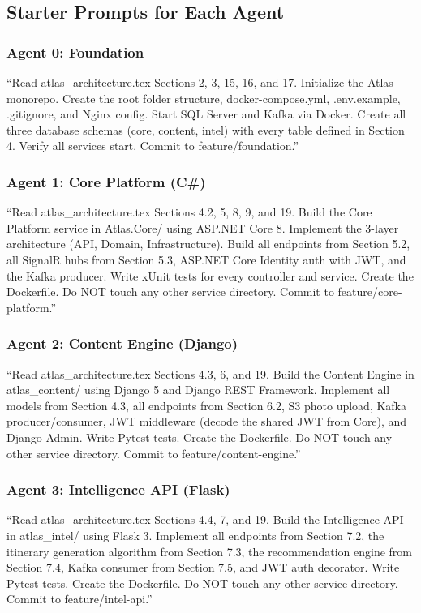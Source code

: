 \documentclass[12pt,letterpaper]{article}
\begin{document}
\subsection{Starter Prompts for Each Agent}

\subsubsection{Agent 0: Foundation}
``Read atlas\_architecture.tex Sections 2, 3, 15, 16, and 17. Initialize the Atlas monorepo. Create the root folder structure, docker-compose.yml, .env.example, .gitignore, and Nginx config. Start SQL Server and Kafka via Docker. Create all three database schemas (core, content, intel) with every table defined in Section 4. Verify all services start. Commit to feature/foundation.''

\subsubsection{Agent 1: Core Platform (C\#)}
``Read atlas\_architecture.tex Sections 4.2, 5, 8, 9, and 19. Build the Core Platform service in Atlas.Core/ using ASP.NET Core 8. Implement the 3-layer architecture (API, Domain, Infrastructure). Build all endpoints from Section 5.2, all SignalR hubs from Section 5.3, ASP.NET Core Identity auth with JWT, and the Kafka producer. Write xUnit tests for every controller and service. Create the Dockerfile. Do NOT touch any other service directory. Commit to feature/core-platform.''

\subsubsection{Agent 2: Content Engine (Django)}
``Read atlas\_architecture.tex Sections 4.3, 6, and 19. Build the Content Engine in atlas\_content/ using Django 5 and Django REST Framework. Implement all models from Section 4.3, all endpoints from Section 6.2, S3 photo upload, Kafka producer/consumer, JWT middleware (decode the shared JWT from Core), and Django Admin. Write Pytest tests. Create the Dockerfile. Do NOT touch any other service directory. Commit to feature/content-engine.''

\subsubsection{Agent 3: Intelligence API (Flask)}
``Read atlas\_architecture.tex Sections 4.4, 7, and 19. Build the Intelligence API in atlas\_intel/ using Flask 3. Implement all endpoints from Section 7.2, the itinerary generation algorithm from Section 7.3, the recommendation engine from Section 7.4, Kafka consumer from Section 7.5, and JWT auth decorator. Write Pytest tests. Create the Dockerfile. Do NOT touch any other service directory. Commit to feature/intel-api.''
\end{document}
